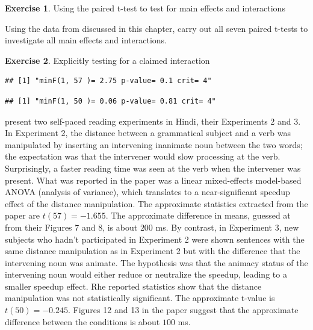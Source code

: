 \documentclass[
  12pt,
]{krantz}
\theoremstyle{definition}
\theoremstyle{definition}
\theoremstyle{definition}
\newtheorem{exercise}{Exercise}[chapter]
\theoremstyle{definition}
\theoremstyle{remark}
\begin{document}
\begin{exercise}
\protect\hypertarget{exr:SamplingDistrnexercisespairedttestfedorenko}{}\label{exr:SamplingDistrnexercisespairedttestfedorenko}Using the paired t-test to test for main effects and interactions
\end{exercise}

Using the data from \citet{fedorenko2006nature} discussed in this chapter, carry out all seven paired t-tests to investigate all main effects and interactions.

\begin{exercise}
\protect\hypertarget{exr:SamplingDistrnexercisesinteraction}{}\label{exr:SamplingDistrnexercisesinteraction}Explicitly testing for a claimed interaction
\end{exercise}

\begin{verbatim}
## [1] "minF(1, 57 )= 2.75 p-value= 0.1 crit= 4"
\end{verbatim}

\begin{verbatim}
## [1] "minF(1, 50 )= 0.06 p-value= 0.81 crit= 4"
\end{verbatim}

\citet{vasishthlewisLanguage05} present two self-paced reading experiments in Hindi, their Experiments 2 and 3. In Experiment 2, the distance between a grammatical subject and a verb was manipulated by inserting an intervening inanimate noun between the two words; the expectation was that the intervener would slow processing at the verb. Surprisingly, a faster reading time was seen at the verb when the intervener was present. What was reported in the paper was a linear mixed-effects model-based ANOVA (analysis of variance), which translates to
a near-significant speedup effect of the distance manipulation. The approximate statistics extracted from the paper are \(t(57) = -1.655\). The approximate difference in means, guessed at from their Figures 7 and 8, is about \(200\) ms. By contrast, in Experiment 3, new subjects who hadn't participated in Experiment 2 were shown sentences with the same distance manipulation as in Experiment 2 but with the difference that the intervening noun was animate. The hypothesis was that the animacy status of the intervening noun would either reduce or neutralize the speedup, leading to a smaller speedup effect. Rhe reported statistics show that the distance manipulation was not statistically significant. The approximate t-value is \(t(50) = -0.245\). Figures 12 and 13 in the paper suggest that the approximate difference between the conditions is about \(100\) ms.
\end{document}
